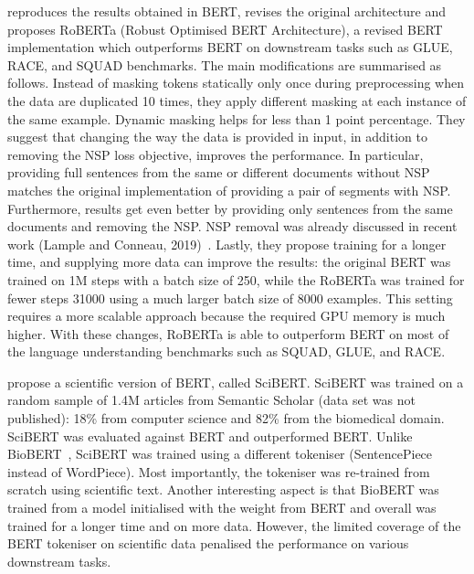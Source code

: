 \cite{liu2019roberta} reproduces the results obtained in BERT, revises the original architecture and proposes RoBERTa (Robust Optimised BERT Architecture), a revised BERT implementation which outperforms BERT on downstream tasks such as GLUE, RACE, and SQUAD benchmarks. 
The main modifications are summarised as follows. Instead of masking tokens statically only once during preprocessing when the data are duplicated 10 times, they apply different masking at each instance of the same example. Dynamic masking helps for less than 1 point percentage.
They suggest that changing the way the data is provided in input, in addition to removing the NSP loss objective, improves the performance. 
In particular, providing full sentences from the same or different documents without NSP matches the original implementation of providing a pair of segments with NSP. 
Furthermore, results get even better by providing only sentences from the same documents and removing the NSP.
 NSP removal was already discussed in recent work (Lample and Conneau, 2019)~\cite{lample2019cross}.
Lastly, they propose training for a longer time, and supplying more data can improve the results: the original BERT was trained on 1M steps with a batch size of 250, while the RoBERTa was trained for fewer steps 31000 using a much larger batch size of 8000 examples. This setting requires a more scalable approach because the required GPU memory is much higher. 
With these changes, RoBERTa is able to outperform BERT on most of the language understanding benchmarks such as SQUAD, GLUE, and RACE. 

\cite{Beltagy2019SciBERT} propose a scientific version of BERT, called SciBERT. 
SciBERT was trained on a random sample of 1.4M articles from Semantic Scholar (data set was not published): 18\% from computer science and 82\% from the biomedical domain. SciBERT was evaluated against BERT and outperformed BERT. 
Unlike BioBERT~\cite{lee2019biobert}, SciBERT was trained using a different tokeniser (SentencePiece instead of WordPiece). Most importantly, the tokeniser was re-trained from scratch using scientific text.
Another interesting aspect is that BioBERT was trained from a model initialised with the weight from BERT and overall was trained for a longer time and on more data. However, the limited coverage of the BERT tokeniser on scientific data penalised the performance on various downstream tasks.

